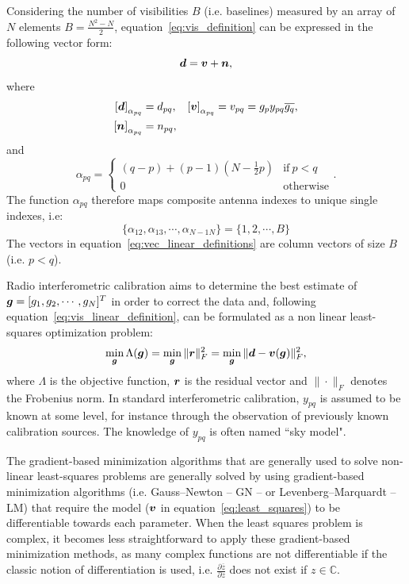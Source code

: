 \documentclass[useAMS,usenatbib]{mn2e}
\newcommand{\br}{\bmath{r}}
\newcommand{\bg}{\bmath{g}}
\newcommand{\bd}{\bmath{d}}
\newcommand{\bv}{\bmath{v}}
\newcommand{\bn}{\bmath{n}}
\newcommand{\conj}[1]{\overline{#1}}
\begin{document}
Considering the number of visibilities $B$ (i.e. baselines) measured by an array of $N$ elements $B = \frac{N^2-N}{2}$, equation~\ref{eq:vis_definition} can be expressed in the following vector form:
\begin{equation}
\label{eq:vis_linear_definition}
\bd = \bv + \bn, 
\end{equation}
where 
\begin{align}
 \left [ \bd \right]_{\alpha_{pq}} &= d_{pq}, & \left [ \bv \right ]_{\alpha_{pq}} &= v_{pq}=g_p y_{pq} \conj{g_q},\nonumber\\
 \left [ \bn \right ]_{\alpha_{pq}} &= n_{pq}, &  &\label{eq:vec_linear_definitions}
\end{align}
and 
\begin{equation}
\alpha_{pq} =
\begin{cases}
(q-p) + (p-1)\left (N-\frac{1}{2}p \right ) & \textrm{if}~p<q\\
0 & \textrm{otherwise}
\end{cases}.
\end{equation}
The function $\alpha_{pq}$ therefore maps composite antenna indexes to unique single indexes, i.e:
\begin{equation}
\{\alpha_{12},\alpha_{13},\cdots,\alpha_{N-1N}\} = \{1,2,\cdots,B\} 
\end{equation}
The vectors in equation~\ref{eq:vec_linear_definitions} are column vectors of size $B$ (i.e. $p<q$).

Radio interferometric calibration aims to determine the best estimate of $\bg = [g_1,g_2,\cdots,g_N]^T$ in order to correct the data and, following equation~\ref{eq:vis_linear_definition}, can be formulated as a non linear least-squares optimization problem:
\begin{equation}
\label{eq:least_squares}
\min_{\bg} \Lambda(\bg) = \min_{\bg} \|\br\|_F^2 = \min_{\bg} \|\bd - \bv(\bg)\|_F^2, 
\end{equation}
where $\Lambda$ is the objective function, $\br$ is the residual vector and $\|\cdot\|_F$ denotes the Frobenius norm. In standard interferometric calibration, $y_{pq}$ is assumed to be known at some level, for instance through the observation of previously known calibration sources. The knowledge of $y_{pq}$ is often named ``sky model".

The gradient-based minimization algorithms that are generally used to solve non-linear least-squares problems are generally solved by using gradient-based minimization algorithms (i.e. Gauss--Newton -- GN -- or Levenberg--Marquardt -- LM) that require the model ($\bv$ in equation~\ref{eq:least_squares}) to be differentiable towards each parameter. 
When the least squares problem is complex, it becomes less straightforward to apply these gradient-based minimization methods, as
many complex functions are not differentiable if the classic notion of differentiation is used, i.e. $\frac{\partial \conj{z}}{\partial z}$ does not exist if $z \in \mathbb{C}$.
\end{document}
